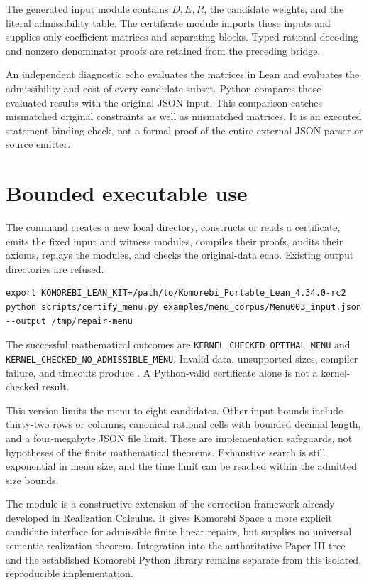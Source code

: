 The generated input module contains $D,E,R$, the candidate weights, and the literal admissibility table. The certificate module imports those inputs and supplies only coefficient matrices and separating blocks. Typed rational decoding and nonzero denominator proofs are retained from the preceding bridge.

An independent diagnostic echo evaluates the matrices in Lean and evaluates the admissibility and cost of every candidate subset. Python compares those evaluated results with the original JSON input. This comparison catches mismatched original constraints as well as mismatched matrices. It is an executed statement-binding check, not a formal proof of the entire external JSON parser or source emitter.

\section{Bounded executable use}

The command  creates a new local directory, constructs or reads a certificate, emits the fixed input and witness modules, compiles their proofs, audits their axioms, replays the modules, and checks the original-data echo. Existing output directories are refused.

\begin{Verbatim}[fontsize=\small,breaklines=true]
export KOMOREBI_LEAN_KIT=/path/to/Komorebi_Portable_Lean_4.34.0-rc2
python scripts/certify_menu.py examples/menu_corpus/Menu003_input.json --output /tmp/repair-menu
\end{Verbatim}

The successful mathematical outcomes are \nolinkurl{KERNEL_CHECKED_OPTIMAL_MENU} and \nolinkurl{KERNEL_CHECKED_NO_ADMISSIBLE_MENU}. Invalid data, unsupported sizes, compiler failure, and timeouts produce . A Python-valid certificate alone is not a kernel-checked result.

This version limits the menu to eight candidates. Other input bounds include thirty-two rows or columns, canonical rational cells with bounded decimal length, and a four-megabyte JSON file limit. These are implementation safeguards, not hypotheses of the finite mathematical theorems. Exhaustive search is still exponential in menu size, and the time limit can be reached within the admitted size bounds.

The module is a constructive extension of the correction framework already developed in Realization Calculus. It gives Komorebi Space a more explicit candidate interface for admissible finite linear repairs, but supplies no universal semantic-realization theorem. Integration into the authoritative Paper III tree and the established Komorebi Python library remains separate from this isolated, reproducible implementation.
